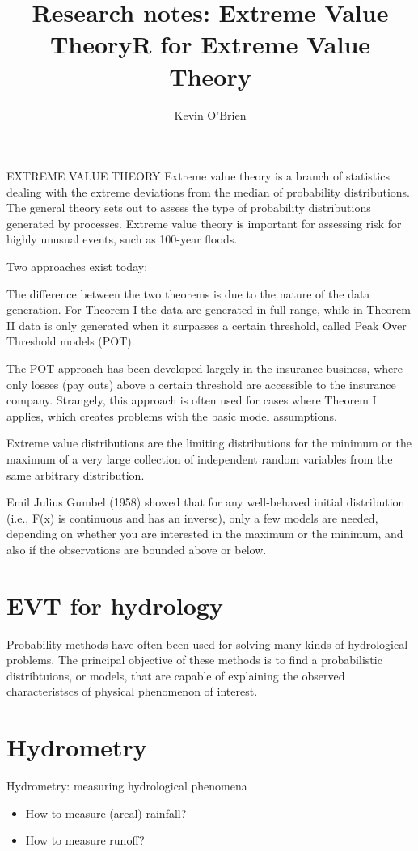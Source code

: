\documentclass[12pt, a4paper]{article}
\title{Research notes: Extreme Value Theory}
\author{ } \date{ }
\theoremstyle{plain}
\theoremstyle{definition}
\theoremstyle{remark}
\begin{document}
\author{Kevin O'Brien}
\title{R for Extreme Value Theory}

EXTREME VALUE THEORY
Extreme value theory is a branch of statistics dealing with the extreme deviations from the median of probability distributions. The general theory sets out to assess the type of probability distributions generated by processes. Extreme value theory is important for assessing risk for highly unusual events, such as 100-year floods.

 

Two approaches exist today:

The difference between the two theorems is due to the nature of the data generation. For Theorem I the data are generated in full range, while in Theorem II data is only generated when it surpasses a certain threshold, called Peak Over Threshold models (POT).

The POT approach has been developed largely in the insurance business, where only losses (pay outs) above a certain threshold are accessible to the insurance company. Strangely, this approach is often used for cases where Theorem I applies, which creates problems with the basic model assumptions.

Extreme value distributions are the limiting distributions for the minimum or the maximum of a very large collection of independent random variables from the same arbitrary distribution.

Emil Julius Gumbel (1958) showed that for any well-behaved initial distribution (i.e., F(x) is continuous and has an inverse), only a few models are needed, depending on whether you are interested in the maximum or the minimum, and also if the observations are bounded above or below.
\section{EVT for hydrology}
Probability methods have often been used for solving many kinds of hydrological problems. The principal objective of these methods is to find a probabilistic distribtuions, or models, that are capable of explaining the observed  characteristscs of physical phenomenon of interest.


\section{Hydrometry}
Hydrometry: measuring hydrological phenomena
\begin{itemize}
\item How to measure (areal) rainfall?
\item How to measure runoff?
\end{itemize}
\end{document}
